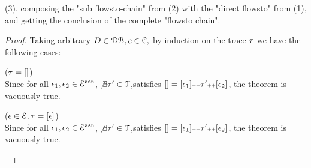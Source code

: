 (3). composing the "sub flowsto-chain" from (2) with the  "direct flowsto" from (1), and getting the conclusion of
 the complete "flowsto chain".
%
\begin{proof}
  Taking arbitrary $D \in \mathcal{DB} , c \in \mathcal{C},$ by induction on the trace $\mathtt{\tau}$ we have the following cases:
  \begin{case}($\mathtt{\tau} = {[]}$)
    \\
    Since for all $\mathtt{\epsilon}_1, \mathtt{\epsilon}_2 \in \mathcal{E}^{\mathtt{{asn}}}$,
     $\not\exists \mathtt{\tau}' \in \mathcal{T}$,satisfies $
    {[]}  = [\mathtt{\epsilon}_1] {\scriptscriptstyle ++} \mathtt{\tau}' {\scriptscriptstyle ++} [\mathtt{\epsilon}_2]$, the theorem is vacuously true.
    \end{case}
    \begin{case}($\mathtt{\epsilon} \in \mathcal{E}, \mathtt{\tau} = [\mathtt{\epsilon}]$)
    \\
    Since for all $\mathtt{\epsilon}_1, \mathtt{\epsilon}_2 \in \mathcal{E}^{\mathtt{{asn}}}$,
     $\not\exists \mathtt{\tau}' \in \mathcal{T}$,satisfies $
    {[]} = [\mathtt{\epsilon}_1] {\scriptscriptstyle ++} \mathtt{\tau}' {\scriptscriptstyle ++} [\mathtt{\epsilon}_2]$, the theorem is vacuously true.
    \end{case}
\end{proof}
